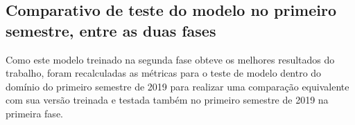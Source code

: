        \begin{figure}[H]
        \end{figure}

     

    
        \begin{figure}[H]
        \end{figure}
    

    \subsection{Comparativo de teste do modelo no primeiro semestre, entre as duas fases}
    
        Como este modelo treinado na segunda fase obteve os melhores resultados do trabalho, foram recalculadas as métricas para o teste de modelo dentro do domínio do primeiro semestre de 2019 para realizar uma comparação equivalente com sua versão treinada e testada também no primeiro semestre de 2019 na primeira fase.
        
